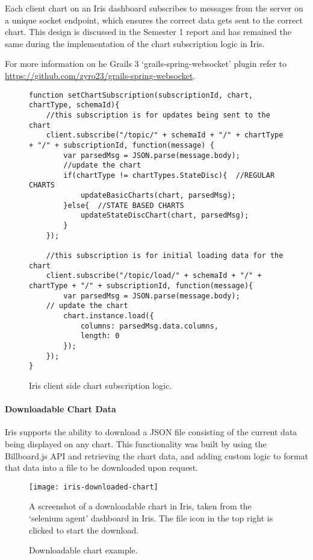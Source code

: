 \documentclass[12pt,a4paper,titlepage]{report}
\begin{document}
Each client chart on an Iris dashboard subscribes to messages from the server on a unique socket endpoint, which ensures the correct data gets sent to the correct chart. This design is discussed in the Semester 1 report and has remained the same during the implementation of the chart subscription logic in Iris.

For more information on he Grails 3 `grails-spring-websocket' plugin refer to \url{https://github.com/zyro23/grails-spring-websocket}.
\begin{figure}[H]
\begin{tcolorbox}
\begin{verbatim}
function setChartSubscription(subscriptionId, chart, chartType, schemaId){
    //this subscription is for updates being sent to the chart
    client.subscribe("/topic/" + schemaId + "/" + chartType + "/" + subscriptionId, function(message) {
        var parsedMsg = JSON.parse(message.body);
        //update the chart
        if(chartType != chartTypes.StateDisc){  //REGULAR CHARTS
            updateBasicCharts(chart, parsedMsg);
        }else{  //STATE BASED CHARTS
            updateStateDiscChart(chart, parsedMsg);
        }
    });

    //this subscription is for initial loading data for the chart
    client.subscribe("/topic/load/" + schemaId + "/" + chartType + "/" + subscriptionId, function(message){
        var parsedMsg = JSON.parse(message.body);
    // update the chart
        chart.instance.load({
            columns: parsedMsg.data.columns,
            length: 0
        });
    });
}
\end{verbatim}
\end{tcolorbox}
\caption{Iris client side chart subscription logic.}
\end{figure}

\paragraph{Downloadable Chart Data}

Iris supports the ability to download a JSON file consisting of the current data being displayed on any chart. This functionality was built by using the Billboard.js API and retrieving the chart data, and adding custom logic to format that data into a file to be downloaded upon request.
\begin{figure}[H]
\begin{tcolorbox}
\begin{center}
\texttt{[image: iris-downloaded-chart]}
\end{center}
A screenshot of a downloadable chart in Iris, taken from the `selenium agent' dashboard in Iris. The file icon in the top right is clicked to start the download.
\end{tcolorbox}
\caption{Downloadable chart example.}
\label{fig:downloaded:chart}
\end{figure}
\end{document}
